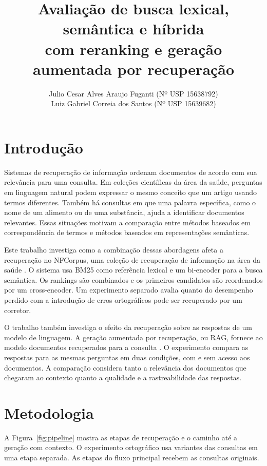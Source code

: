 \documentclass[12pt]{article}
\title{Avaliação de busca lexical, semântica e híbrida\\
  com reranking e geração aumentada por recuperação}
\author{Julio Cesar Alves Araujo Fuganti\inst{1} (Nº USP 15638792)\\
  Luiz Gabriel Correia dos Santos\inst{1} (Nº USP 15639682)}
\begin{document}
\maketitle

\section{Introdução}

Sistemas de recuperação de informação ordenam documentos de acordo com sua
relevância para uma consulta. Em coleções científicas da área da saúde, perguntas
em linguagem natural podem expressar o mesmo conceito que um artigo usando
termos diferentes. Também há consultas em que uma palavra específica, como o
nome de um alimento ou de uma substância, ajuda a identificar documentos
relevantes. Essas situações motivam a comparação entre métodos baseados em
correspondência de termos e métodos baseados em representações semânticas.

Este trabalho investiga como a combinação dessas abordagens afeta a recuperação
no NFCorpus, uma coleção de recuperação de informação na área da saúde
\cite{boteva2016,thakur2021}. O sistema usa BM25 como referência lexical e um
bi-encoder para a busca semântica. Os rankings são combinados e os primeiros
candidatos são reordenados por um cross-encoder. Um experimento separado avalia
quanto do desempenho perdido com a introdução de erros ortográficos pode ser
recuperado por um corretor.

O trabalho também investiga o efeito da recuperação sobre as respostas de um
modelo de linguagem. A geração aumentada por recuperação, ou RAG, fornece ao
modelo documentos recuperados para a consulta \cite{lewis2020}. O experimento
compara as respostas para as mesmas perguntas em duas condições, com e sem
acesso aos documentos. A comparação considera tanto a relevância dos documentos
que chegaram ao contexto quanto a qualidade e a rastreabilidade das respostas.

\section{Metodologia}

A Figura~\ref{fig:pipeline} mostra as etapas de recuperação e o caminho até a
geração com contexto. O experimento ortográfico usa variantes das consultas em
uma etapa separada. As etapas do fluxo principal recebem as consultas originais.
\end{document}
